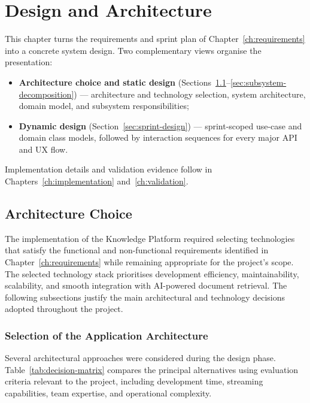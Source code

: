 \chapter{Design and Architecture}
\label{ch:architecture}

This chapter turns the requirements and sprint plan of Chapter~\ref{ch:requirements}
into a concrete system design. Two complementary views organise the presentation:
\begin{itemize}[leftmargin=*,itemsep=0.2em]
  \item \textbf{Architecture choice and static design} (Sections~\ref{sec:technology-justification}--\ref{sec:subsystem-decomposition}) --- architecture and technology selection, system architecture, domain model, and subsystem responsibilities;
  \item \textbf{Dynamic design} (Section~\ref{sec:sprint-design}) --- sprint-scoped use-case and domain class models, followed by interaction sequences for every major API and UX flow.
\end{itemize}
Implementation details and validation evidence follow in
Chapters~\ref{ch:implementation} and~\ref{ch:validation}.

\section{Architecture Choice}
\label{sec:technology-justification}

The implementation of the Knowledge Platform required selecting technologies that
satisfy the functional and non-functional requirements identified in
Chapter~\ref{ch:requirements} while remaining appropriate for the project's scope.
The selected technology stack prioritises development efficiency, maintainability,
scalability, and smooth integration with AI-powered document retrieval. The
following subsections justify the main architectural and technology decisions
adopted throughout the project.

\subsection{Selection of the Application Architecture}
\label{subsec:app-architecture-selection}

Several architectural approaches were considered during the design phase.
Table~\ref{tab:decision-matrix} compares the principal alternatives using
evaluation criteria relevant to the project, including development time, streaming
capabilities, team expertise, and operational complexity.

